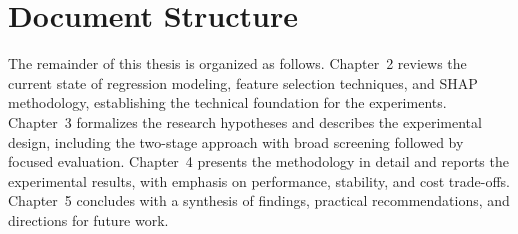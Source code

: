 \section{Document Structure}

The remainder of this thesis is organized as follows. Chapter~2 reviews the current state of regression modeling, feature selection techniques, and SHAP methodology, establishing the technical foundation for the experiments. Chapter~3 formalizes the research hypotheses and describes the experimental design, including the two-stage approach with broad screening followed by focused evaluation. Chapter~4 presents the methodology in detail and reports the experimental results, with emphasis on performance, stability, and cost trade-offs. Chapter~5 concludes with a synthesis of findings, practical recommendations, and directions for future work.
